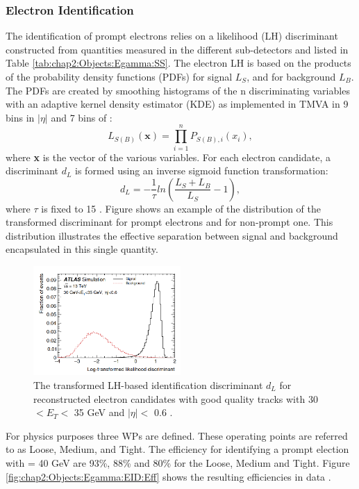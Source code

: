 \subsubsection{Electron Identification}
\label{chap2:Objects:Egamma:EID}
The identification of prompt electrons relies on a likelihood (LH) discriminant constructed from quantities measured in the different sub-detectors and listed in Table \ref{tab:chap2:Objects:Egamma:SS}. The electron LH is based on the products of the probability density functions (PDFs) for signal $L_S$, and for background $L_B$. The PDFs are created by smoothing histograms of the n discriminating variables with an adaptive kernel density estimator (KDE) \cite{KDE} as implemented in TMVA \cite{TMVA} in 9 bins in $|\eta|$ and 7 bins of \eT:
\begin{equation}
    L_{S(B)}(\textbf{x}) = \displaystyle\prod_{i=1}^{n} P_{S(B),i}(x_i),
\end{equation}
where \textbf{x} is the vector of the various variables. For each electron candidate, a discriminant $d_L$ is formed using an inverse sigmoid function transformation:
\begin{equation}
    d_L = -\frac{1}{\tau}ln(\frac{L_S+L_B}{L_S} - 1),
\end{equation}
where $\tau$ is fixed to 15 \cite{TMVA}. Figure shows an example of the distribution of the transformed discriminant for prompt electrons and for non-prompt one. This distribution illustrates the effective separation between signal and background encapsulated in this single quantity.
\begin{figure}[H]
    \centering
    \includegraphics[width=0.5\textwidth]{Ch2/Img/Electron_LH.png}
    \caption{The transformed LH-based identification discriminant $d_L$ for reconstructed electron candidates with good quality tracks with 30 $<E_T<$ 35 GeV and $|\eta|<$ 0.6 \cite{Electron_ID_2016}.}
    \label{fig:chap2:Objects:Egamma:EID:LH}
\end{figure}
For physics purposes three WPs are defined. These operating points are referred to as Loose, Medium, and Tight. The efficiency for identifying a prompt election with \eT = 40 GeV are 93\%, 88\% and 80\% for the Loose, Medium and Tight. Figure \ref{fig:chap2:Objects:Egamma:EID:Eff} shows the resulting efficiencies in data \cite{Egamma_Perf_run2}. 
